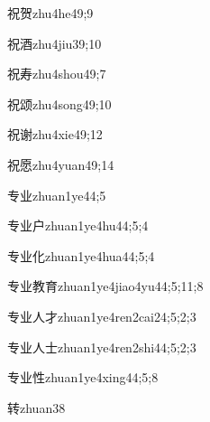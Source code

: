 \begin{verbete}{祝贺}{zhu4he4}{9;9}
\end{verbete}
\begin{verbete}{祝酒}{zhu4jiu3}{9;10}
\end{verbete}
\begin{verbete}{祝寿}{zhu4shou4}{9;7}
\end{verbete}
\begin{verbete}{祝颂}{zhu4song4}{9;10}
\end{verbete}
\begin{verbete}{祝谢}{zhu4xie4}{9;12}
\end{verbete}
\begin{verbete}{祝愿}{zhu4yuan4}{9;14}
\end{verbete}
\begin{verbete}{专业}{zhuan1ye4}{4;5}
\end{verbete}
\begin{verbete}{专业户}{zhuan1ye4hu4}{4;5;4}
\end{verbete}
\begin{verbete}{专业化}{zhuan1ye4hua4}{4;5;4}
\end{verbete}
\begin{verbete}{专业教育}{zhuan1ye4jiao4yu4}{4;5;11;8}
\end{verbete}
\begin{verbete}{专业人才}{zhuan1ye4ren2cai2}{4;5;2;3}
\end{verbete}
\begin{verbete}{专业人士}{zhuan1ye4ren2shi4}{4;5;2;3}
\end{verbete}
\begin{verbete}{专业性}{zhuan1ye4xing4}{4;5;8}
\end{verbete}
\begin{verbete}{转}{zhuan3}{8}
\end{verbete}
